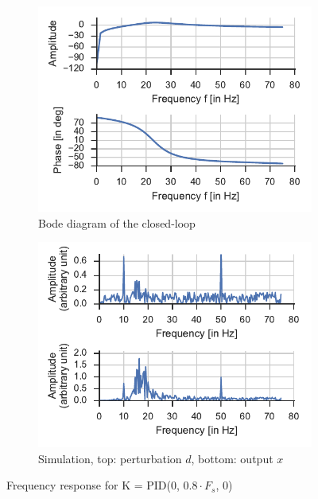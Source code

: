 \begin{figure}
    \centering
    \begin{subfigure}{0.49\textwidth}
        \includegraphics[width=\textwidth]{img/ctl_freqresp_pid}
        \caption{\label{fig:ctl_freqresp_pid} Bode diagram of the closed-loop}
    \end{subfigure}
    \hfill
    \begin{subfigure}{0.49\textwidth}
        \includegraphics[width=\textwidth]{img/ctl_sim_pid}
        \caption{\label{fig:ctl_sim_pid}Simulation, top: perturbation $d$, bottom: output $x$}
        \end{subfigure}    
    \caption{Frequency response for K = PID(0, $0.8\cdot F_s$, 0)}
\end{figure}

